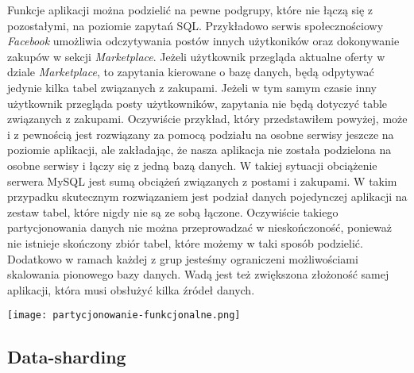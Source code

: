 Funkcje aplikacji można podzielić na pewne podgrupy, które nie łączą się z pozostałymi, na poziomie zapytań SQL. Przykładowo serwis społecznościowy \textit{Facebook} umożliwia odczytywania postów innych użytkoników oraz dokonywanie zakupów w sekcji \textit{Marketplace}. Jeżeli użytkownik przegląda aktualne oferty w dziale \textit{Marketplace}, to zapytania kierowane o bazę danych, będą odpytywać jedynie kilka tabel związanych z zakupami. Jeżeli w tym samym czasie inny użytkownik przegląda posty użytkowników, zapytania nie będą dotyczyć table związanych z zakupami. Oczywiście przykład, który przedstawiłem powyżej, może i z pewnością jest rozwiązany za pomocą podziału na osobne serwisy jeszcze na poziomie aplikacji, ale zakładając, że nasza aplikacja nie została podzielona na osobne serwisy i łączy się z jedną bazą danych. W takiej sytuacji obciążenie serwera MySQL jest sumą obciążeń związanych z postami i zakupami. W takim przypadku skutecznym rozwiązaniem jest podział danych pojedynczej aplikacji na zestaw tabel, które nigdy nie są ze sobą łączone. Oczywiście takiego partycjonowania danych nie można przeprowadzać w nieskończoność, ponieważ nie istnieje skończony zbiór tabel, które możemy w taki sposób podzielić. Dodatkowo w ramach każdej z grup jesteśmy ograniczeni możliwościami skalowania pionowego bazy danych. Wadą jest też zwiększona złożoność samej aplikacji, która musi obsłużyć kilka źródeł danych. 

\begin{center}
	\texttt{[image: partycjonowanie-funkcjonalne.png]} 
\end{center}


\subsection{Data-sharding}
 
